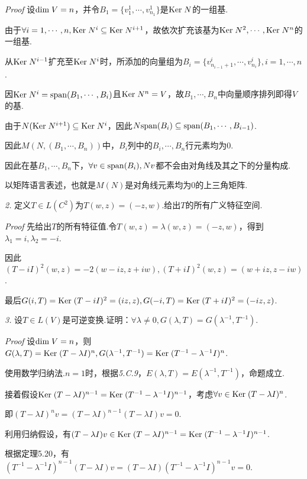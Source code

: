 \textit{Proof}
设\(\mathrm{dim \;} V=n\)，并令\(B_1=\{v_1^1,\cdots,v_{n_1}^1\}\)是\(\mathrm{Ker \;} N\)的一组基.

由于\(\forall i=1,\cdots,n,\mathrm{Ker \;} N^i \subseteq \mathrm{Ker \;} N^{i+1}\)，故依次扩充该基为\(\mathrm{Ker \;} N^2,\cdots,\mathrm{Ker \;} N^n\)的一组基.

从\(\mathrm{Ker \;} N^{i-1}\)扩充至\(\mathrm{Ker \;} N^i\)时，所添加的向量组为\(B_i=\{v_{n_{i-1}+1}^i,\cdots,v_{n_i}^i\},i=1,\cdots,n\).

因\(\mathrm{Ker \;} N^i=\mathrm{span}(B_1,\cdots,B_i)\)且\(\mathrm{Ker \;} N^n=V\)，故\(B_1,\cdots,B_n\)中向量顺序排列即得\(V\)的基.

由于\(N(\mathrm{Ker \;} N^{i+1}) \subseteq \mathrm{Ker \;} N^i\)，因此\(N \mathrm{span}(B_i) \subseteq \mathrm{span}(B_1,\cdots,B_{i-1})\).

因此\(M(N,(B_1,\cdots,B_n))\)中，\(B_i\)列中的\(B_i,\cdots,B_n\)行元素均为\(0\).

因此在基\(B_1,\cdots,B_n\)下，\(\forall v \in \mathrm{span}(B_i),Nv\)都不会由对角线及其之下的分量构成.

以矩阵语言表述，也就是\(M(N)\)是对角线元素均为\(0\)的上三角矩阵.

\newpage

\textit{2.}
定义\(T \in L(C^2)\)为\(T(w,z)=(-z,w)\).给出\(T\)的所有广义特征空间.

\textit{Proof}
先给出\(T\)的所有特征值.令\(T(w,z)=\lambda(w,z)=(-z,w)\)，得到\(\lambda_1=i,\lambda_2=-i\).

因此\((T-iI)^2(w,z)=-2(w-iz,z+iw),(T+iI)^2(w,z)=(w+iz,z-iw)\).

最后\(G(i,T)=\mathrm{Ker \;} (T-iI)^2=(iz,z),G(-i,T)=\mathrm{Ker \;} (T+iI)^2=(-iz,z)\).

\hspace*{\fill}

\textit{3.}
设\(T \in L(V)\)是可逆变换.证明：\(\forall \lambda \ne 0,G(\lambda,T)=G(\lambda^{-1},T^{-1})\).

\textit{Proof}
设\(\mathrm{dim \;} V=n\)，则\(G(\lambda,T)=\mathrm{Ker \;} (T-\lambda I)^n,G(\lambda^{-1},T^{-1})=\mathrm{Ker \;} (T^{-1}-\lambda^{-1} I)^n\).

使用数学归纳法.\(n=1\)时，根据\textit{5.C.9}，\(E(\lambda,T)=E(\lambda^{-1},T^{-1})\)，命题成立.

接着假设\(\mathrm{Ker \;} (T-\lambda I)^{n-1}=\mathrm{Ker \;} (T^{-1}-\lambda^{-1} I)^{n-1}\)，考虑\(\forall v \in \mathrm{Ker \;} (T-\lambda I)^n\).

即\((T-\lambda I)^n v=(T-\lambda I)^{n-1}(T-\lambda I)v=0\).

利用归纳假设，有\((T-\lambda I)v \in \mathrm{Ker \;} (T-\lambda I)^{n-1}=\mathrm{Ker \;} (T^{-1}-\lambda^{-1} I)^{n-1}\).

根据定理5.20，有\((T^{-1}-\lambda^{-1} I)^{n-1}(T-\lambda I)v=(T-\lambda I)(T^{-1}-\lambda^{-1} I)^{n-1}v=0\).

